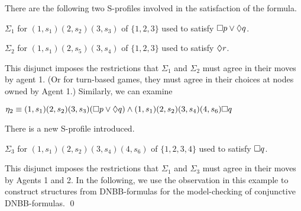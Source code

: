 There are the following
two S-profiles involved in the satisfaction of the formula.
\begin{list1}
\item $\Sigma_1$ for $(1,s_1)(2,s_2)(3,s_3)$ 
	of $\{1,2,3\}$ 
	used to satisfy $\Box p\vee \Diamond q$.
\item $\Sigma_2$ for  $(1,s_1)(2,s_5)(3,s_4)$ 
	of $\{1,2,3\}$ used to satisfy $\Diamond r$.
\end{list1}
This disjunct imposes the restrictions that 
$\Sigma_1$ and $\Sigma_2$ must agree in their moves by agent 1.  
(Or for turn-based games, they must agree in their choices at nodes
owned by Agent 1.)  
Similarly, we can examine 
\begin{center}
$\eta_2\equiv (1,s_1)(2,s_2)(3,s_3)(
	    \Box p\vee \Diamond q
	    )\wedge  
	  (1,s_1)(2,s_2)(3,s_4)(4,s_6)
	     \Box q$
\end{center}
There is a new S-profile introduced. 
\begin{list1}
\item $\Sigma_3$ for  $(1,s_1)(2,s_2)(3,s_4)(4,s_6)$ 
	of $\{1,2,3,4\}$ used to satisfy $\Box q$.
\end{list1}
This disjunct imposes the restrictions that 
$\Sigma_1$ and $\Sigma_3$ must agree in their moves by Agents 1 and 2.
In the following, we use the observation in this example to
construct structures from DNBB-formulas for the model-checking
of conjunctive DNBB-formulas.
\qed



